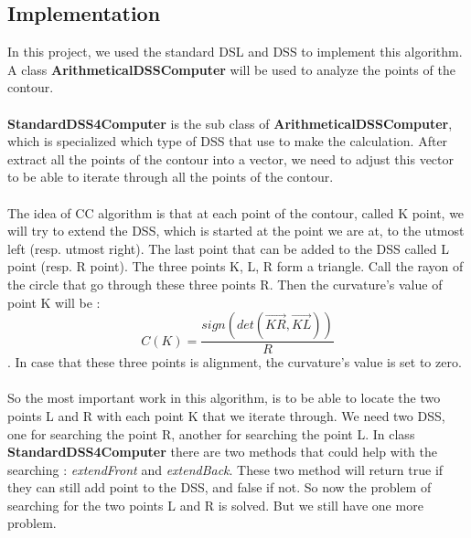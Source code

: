 \subsection{Implementation}
In this project, we used the standard DSL and DSS to implement this algorithm. A class \textbf{ArithmeticalDSSComputer} will be used to analyze the points of the contour.

\paragraph{}
\textbf{StandardDSS4Computer} is the sub class of \textbf{ArithmeticalDSSComputer}, which is specialized which type of DSS that use to make the calculation. After extract all the points of the contour into a vector, we need to adjust this vector to be able to iterate through all the points of the contour. 

\paragraph{}
The idea of CC algorithm is that at each point of the contour, called K point, we will try to extend the DSS, which is started at the point we are at, to the utmost left (resp. utmost right). The last point that can be added to the DSS called L point (resp. R point). The three points K, L, R form a triangle. Call the rayon of the circle that go through these three points R. Then the curvature's value of point K will be :
$$
C(K) = \frac{sign(det(\overrightarrow{KR}, \overrightarrow{KL}))}{R}
$$.  
In case that these three points is alignment, the curvature's value is set to zero.

\paragraph{}
So the most important work in this algorithm, is to be able to locate the two points L and R with each point K that we iterate through. We need two DSS, one for searching the point R, another for searching the point L. In class \textbf{StandardDSS4Computer} there are two methods that could help with the searching : \textit{extendFront} and \textit{extendBack}. These two method will return true if they can still add point to the DSS, and false if not. So now the problem of searching for the two points L and R is solved. But we still have one more problem.

